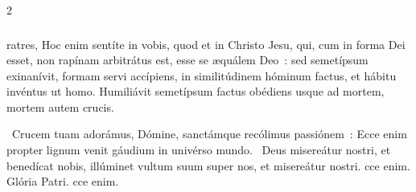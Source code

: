 \documentclass[9pt,twoside]{extarticle}
\begin{document}
\begin{multicols}{2}
\subsubsection*{}
ratres, Hoc enim sentíte in vobis, quod et in Christo Jesu, qui, cum in forma Dei esset, non rapínam arbitrátus est, esse se æquálem Deo~: sed semetípsum exinanívit, formam servi accípiens, in similitúdinem hóminum factus, et hábitu invéntus ut homo. Humiliávit semetípsum factus obédiens usque ad mortem, mortem autem crucis.

\begin{tightlist}{}
\item {}~Crucem tuam adorámus, Dómine, sanctámque recólimus passiónem~: \textred{*} Ecce enim propter lignum venit gáudium in univérso mundo. ~Deus misereátur nostri, et benedícat nobis, illúminet vultum suum super nos, et misereátur nostri. cce enim. Glória Patri. cce enim.
\end{tightlist}


\end{multicols}
\end{document}
